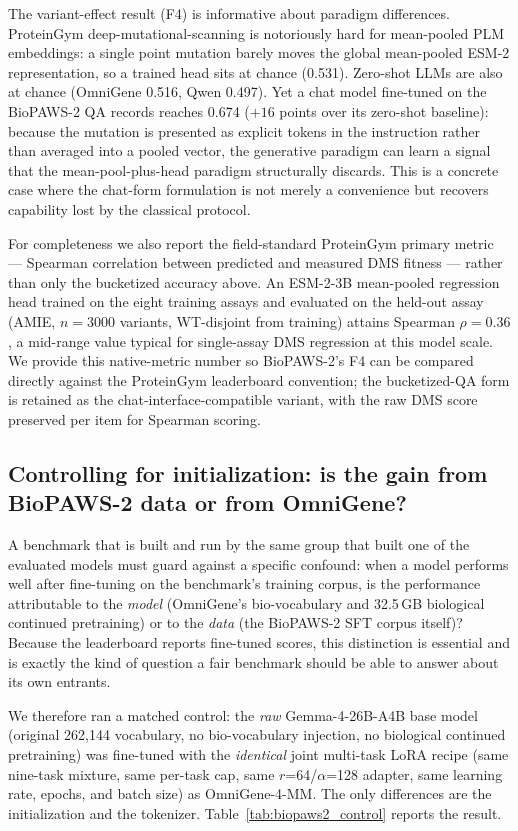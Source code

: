 The variant-effect result (F4) is informative about paradigm differences. ProteinGym
deep-mutational-scanning is notoriously hard for mean-pooled PLM embeddings: a single point
mutation barely moves the global mean-pooled ESM-2 representation, so a trained head sits at
chance (0.531). Zero-shot LLMs are also at chance (OmniGene 0.516, Qwen 0.497). Yet a chat
model fine-tuned on the BioPAWS-2 QA records reaches 0.674 ($+16$ points over its zero-shot
baseline): because the mutation is presented as explicit tokens in the instruction rather
than averaged into a pooled vector, the generative paradigm can learn a signal that the
mean-pool-plus-head paradigm structurally discards. This is a concrete case where the
chat-form formulation is not merely a convenience but recovers capability lost by the
classical protocol.

For completeness we also report the field-standard ProteinGym primary metric --- Spearman
correlation between predicted and measured DMS fitness --- rather than only the bucketized
accuracy above. An ESM-2-3B mean-pooled regression head trained on the eight training assays
and evaluated on the held-out assay (AMIE, $n{=}3000$ variants, WT-disjoint from training)
attains Spearman $\rho = 0.36$, a mid-range value typical for single-assay DMS regression at
this model scale. We provide this native-metric number so BioPAWS-2's F4 can be compared
directly against the ProteinGym leaderboard convention; the bucketized-QA form is retained
as the chat-interface-compatible variant, with the raw DMS score preserved per item for
Spearman scoring.

\subsection{Controlling for initialization: is the gain from BioPAWS-2 data or from OmniGene?}
\label{sec:biopaws2_control}

A benchmark that is built and run by the same group that built one of the evaluated models
must guard against a specific confound: when a model performs well after fine-tuning on the
benchmark's training corpus, is the performance attributable to the \emph{model}
(OmniGene's bio-vocabulary and 32.5\,GB biological continued pretraining) or to the
\emph{data} (the BioPAWS-2 SFT corpus itself)? Because the leaderboard reports fine-tuned
scores, this distinction is essential and is exactly the kind of question a fair benchmark
should be able to answer about its own entrants.

We therefore ran a matched control: the \emph{raw} Gemma-4-26B-A4B base model (original
262{,}144 vocabulary, no bio-vocabulary injection, no biological continued pretraining) was
fine-tuned with the \emph{identical} joint multi-task LoRA recipe (same nine-task mixture,
same per-task cap, same $r$=64/$\alpha$=128 adapter, same learning rate, epochs, and
batch size) as OmniGene-4-MM. The only differences are the initialization and the
tokenizer. Table~\ref{tab:biopaws2_control} reports the result.

